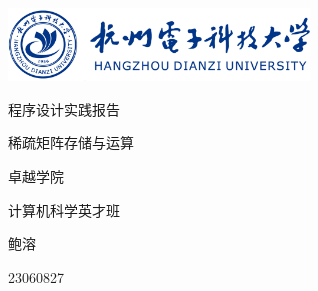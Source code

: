 \documentclass[a4paper]{article}
\begin{document}
\begin{titlepage}


\parbox[c]{8cm}{
    \includegraphics[width=8cm]{hdu.png}
}

\setlength{\parindent}{0pt}
\centering
\vfill
{ \heiti \textcolor{xblue}{程序设计实践报告}\par}
\vspace{10pt}
{ \heiti 稀疏矩阵存储与运算\par}
\vfill
{\large \heiti 卓越学院\par
计算机科学英才班\par
鲍溶\par
23060827\par
}
\vfill
\restoregeometry

\end{titlepage}
\end{document}
